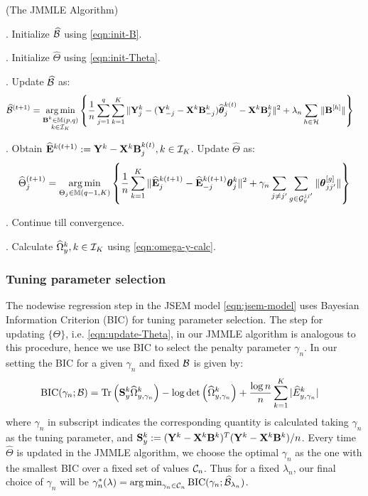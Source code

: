 \begin{Algorithm}
(The JMMLE Algorithm)
\label{algo:jmmle-algo}

. Initialize $\widehat {{\cal{B}}}$ using \eqref{eqn:init-B}.

. Initialize $\widehat \Theta$ using \eqref{eqn:init-Theta}.

. Update $\widehat {{\cal{B}}}$ as:
%
\begin{align}\label{eqn:update-B}
\widehat {{\cal{B}}}^{(t+1)} &= \operatorname*{arg\,min}_{\substack{{\mathbf{B}}^k \in {\mathbb{M}}(p,q)\\k \in {\cal{I}}_K}} \left\{ \frac{1}{n} \sum_{j=1}^q \sum_{k=1}^K \| {\mathbf{Y}}^k_j - ({\mathbf{Y}}_{-j}^k - {\mathbf{X}}^k {\mathbf{B}}_{-j}^k) \widehat {{\boldsymbol{\theta}}}_j^{k (t)} - {\mathbf{X}}^k {\mathbf{B}}_j^{k } \|^2
+ \lambda_n \sum_{h \in {\cal{H}}} \| {\mathbf{B}}^{[h]} \| \right\}
\end{align}

. Obtain $\widehat {{\mathbf{E}}}^{k (t+1)} := {\mathbf{Y}}^k - {\mathbf{X}}^k {\mathbf{B}}_j^{k (t)}, k \in {\cal{I}}_K$. Update $\widehat \Theta$ as:
%
\begin{align}\label{eqn:update-Theta}
\widehat \Theta_j^{(t+1)} = \operatorname*{arg\,min}_{\Theta_j \in {\mathbb{M}}(q-1, K)}
\left\{ \frac{1}{n} \sum_{k=1}^K
\| \widehat {{\mathbf{E}}}_j^{k (t+1)} - \widehat {{\mathbf{E}}}_{-j}^{k (t+1)} {\boldsymbol{\theta}}_j^k \|^2
+ \gamma_n \sum_{j \neq j'} \sum_{g \in {\cal{G}}_y^{jj'}} \| {\boldsymbol{\theta}}_{jj'}^{[g]} \| \right\}
\end{align}

. Continue till convergence.

. Calculate $\widehat \Omega_y^k, k \in {\cal{I}}_K$ using \eqref{eqn:omega-y-calc}.
\end{Algorithm}

\subsubsection{Tuning parameter selection}
The nodewise regression step in the JSEM model \eqref{eqn:jsem-model} uses Bayesian Information Criterion (BIC) for tuning parameter selection. The step for updating $\{ \Theta \}$, i.e. \eqref{eqn:update-Theta}, in our JMMLE algorithm is analogous to this procedure, hence we use BIC to select the penalty parameter $\gamma_n$. In our setting the BIC for a given $\gamma_n$ and fixed ${\cal{B}}$ is given by:
%
\begin{align*}
\text{BIC} (\gamma_n; {\cal{B}}) &=
\operatorname*{Tr} \left( {\mathbf{S}}_y^k \widehat \Omega_{y,\gamma_n}^k \right) - \log \det \left( \widehat \Omega_{y,\gamma_n}^k \right) +
\frac{\log n}{n} \sum_{k=1}^K | \widehat E_{y,\gamma_n}^k |
\end{align*}
%
where $\gamma_n$ in subscript indicates the corresponding quantity is calculated taking $\gamma_n$ as the tuning parameter, and ${\mathbf{S}}_y^k := ({\mathbf{Y}}^k - {\mathbf{X}}^k {\mathbf{B}}^k)^T ({\mathbf{Y}}^k - {\mathbf{X}}^k {\mathbf{B}}^k)/n$. Every time $\widehat \Theta$ is updated in the JMMLE algorithm, we choose the optimal $\gamma_n$ as the one with the smallest BIC over a fixed set of values ${\cal{C}}_n$. Thus for a fixed $\lambda_n$, our final choice of $\gamma_n$ will be 
$
\gamma_n^* (\lambda) = \operatorname*{arg\,min}_{\gamma_n \in {\cal{C}}_n} \text{BIC} (\gamma_n; \widehat {{\cal{B}}}_{\lambda_n})
$.

